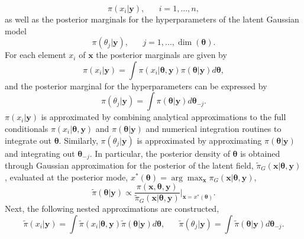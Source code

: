 \begin{equation*}
    \pi\left(x_i|\pmb{y}\right),\hspace{20pt}i=1,...,n,
\end{equation*}
as well as the posterior marginals for the hyperparameters of the latent Gaussian model
\begin{equation*}
    \pi\left(\theta_j|\pmb{y}\right),\hspace{20pt}j=1,...,\dim\left(\pmb{\theta}\right).
\end{equation*}
For each element $x_i$ of $\pmb{x}$ the posterior marginals are given by
\begin{equation}
    \pi\left(x_i|\pmb{y}\right)=\int\pi\left(x_i|\pmb{\theta},\pmb{y}\right)\pi\left(\pmb{\theta}|\pmb{y}\right)d\pmb{\theta},
\end{equation}
and the posterior marginal for the hyperparameters can be expressed by
\begin{equation}
    \pi\left(\theta_j|\pmb{y}\right)=\int\pi\left(\pmb{\theta}|\pmb{y}\right)d\pmb{\theta}_{-j}.
\end{equation}
$\pi\left(x_i|\pmb{y}\right)$ is approximated by combining analytical approximations to the full conditionals $\pi\left(x_i|\pmb{\theta},\pmb{y}\right)$ and $\pi\left(\pmb{\theta}|\pmb{y}\right)$ and numerical integration routines to integrate out $\pmb{\theta}$. Similarly, $\pi\left(\theta_j|\pmb{y}\right)$ is approximated by approximating $\pi\left(\pmb{\theta}|\pmb{y}\right)$ and integrating out $\pmb{\theta}_{-j}$. In particular, the posterior density of $\pmb{\theta}$ is obtained through Gaussian approximation for the posterior of the latent field, $\widetilde{\pi}_G\left(\pmb{x}|\pmb{\theta},\pmb{y}\right)$, evaluated at the posterior mode, $x^*\left(\pmb{\theta}\right)=\arg\max_{\pmb{x}}\pi_G\left(\pmb{x}|\pmb{\theta},\pmb{y}\right)$,
\begin{equation}
    \widetilde{\pi}\left(\pmb{\theta}|\pmb{y}\right)\propto\frac{\pi\left(\pmb{x},\pmb{\theta},\pmb{y}\right)}{\widetilde{\pi}_G\left(\pmb{x}|\pmb{\theta},\pmb{y}\right)}\bigg|_{\pmb{x}=x^*\left(\pmb{\theta}\right)}.
\end{equation}
Next, the following nested approximations are constructed,
\begin{equation}
    \widetilde{\pi}\left(x_i|\pmb{y}\right)=\int\widetilde{\pi}\left(x_i|\pmb{\theta},\pmb{y}\right)\widetilde{\pi}\left(\pmb{\theta}|\pmb{y}\right)d\pmb{\theta},\hspace{20pt}\widetilde{\pi}\left(\theta_j|\pmb{y}\right)=\int\widetilde{\pi}\left(\pmb{\theta}|\pmb{y}\right)d\pmb{\theta}_{-j}.
\end{equation}
